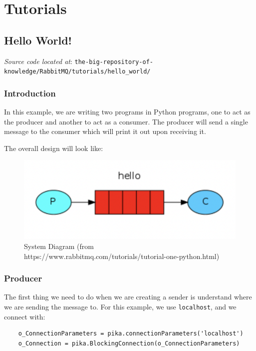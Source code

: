 \documentclass{article}
\begin{document}
\section{Tutorials}

\subsection{Hello World!}

\textit{Source code located at}: \verb|the-big-repository-of-knowledge/RabbitMQ/tutorials/hello_world/|

\subsubsection{Introduction}

In this example, we are writing two programs in Python programs, one to act as the producer and another to act as a consumer. The producer will send a single message to the consumer which will print it out upon receiving it. 

The overall design will look like: 

\begin{figure}[H]
    \centering
    \includegraphics[scale=0.8]{RabbitMQ/images/t1-1.png}
    \caption{System Diagram (from https://www.rabbitmq.com/tutorials/tutorial-one-python.html)}
    \label{t1-1}
\end{figure}

\subsubsection{Producer}

The first thing we need to do when we are creating a sender is understand where we are sending the message to. For this example, we use \verb|localhost|, and we connect with:

\begin{verbatim}
    o_ConnectionParameters = pika.connectionParameters('localhost')
    o_Connection = pika.BlockingConnection(o_ConnectionParameters)
\end{verbatim}
\end{document}
